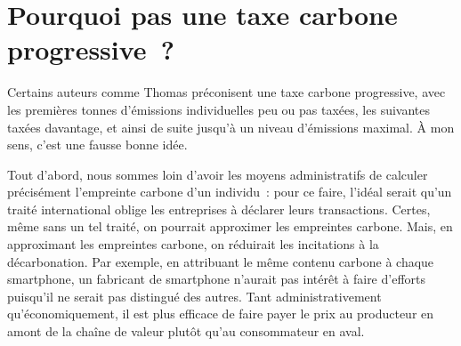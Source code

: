 \documentclass[a5paper,french,openany]{memoir}
\begin{document}
\section*{\normalsize Pourquoi pas une taxe carbone progressive~?}\label{q:taxe_progressive}

Certains auteurs comme Thomas \cite{piketty_capital_2019} préconisent une taxe carbone progressive, avec les premières tonnes d'émissions individuelles peu ou pas taxées, les suivantes taxées davantage, et ainsi de suite jusqu'à un niveau d'émissions maximal. À mon sens, c'est une fausse bonne idée. 

Tout d'abord, nous sommes loin d'avoir les moyens administratifs de calculer précisément l'empreinte carbone d'un individu~: pour ce faire, l'idéal serait qu'un traité international oblige les entreprises à déclarer leurs transactions. Certes,  même sans un tel traité, on pourrait approximer les empreintes carbone. Mais, en approximant les empreintes carbone, on réduirait les incitations à la décarbonation. Par exemple, en attribuant le même contenu carbone à chaque smartphone, un fabricant de smartphone n'aurait pas intérêt à faire d'efforts puisqu'il ne serait pas distingué des autres. Tant administrativement qu'économiquement, il est plus efficace de faire payer le prix au producteur en amont de la chaîne de valeur plutôt qu'au consommateur en aval. 
\end{document}
